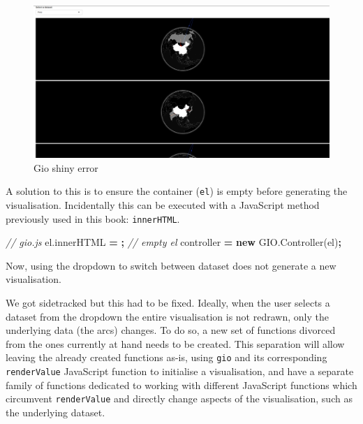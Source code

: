 \documentclass[
]{krantz}
\makeatletter
\newenvironment{Shaded}{\begin{snugshade}}{\end{snugshade}}
\newcommand{\AttributeTok}[1]{\textcolor[rgb]{0.61,0.61,0.61}{#1}}
\newcommand{\CommentTok}[1]{\textcolor[rgb]{0.37,0.37,0.37}{\textit{#1}}}
\newcommand{\KeywordTok}[1]{\textcolor[rgb]{0.27,0.27,0.27}{\textbf{#1}}}
\newcommand{\NormalTok}[1]{#1}
\newcommand{\OperatorTok}[1]{\textcolor[rgb]{0.43,0.43,0.43}{\textbf{#1}}}
\newcommand{\StringTok}[1]{\textcolor[rgb]{0.5,0.5,0.5}{#1}}
\newcommand{\VariableTok}[1]{\textcolor[rgb]{0,0,0}{#1}}
\newenvironment{kframe}{%
\medskip{}
\setlength{\fboxsep}{.8em}
 \def\at@end@of@kframe{}%
 \ifinner\ifhmode%
  \def\at@end@of@kframe{\end{minipage}}%
  \begin{minipage}{\columnwidth}%
 \fi\fi%
 \def\FrameCommand##1{\hskip\@totalleftmargin \hskip-\fboxsep
 \colorbox{shadecolor}{##1}\hskip-\fboxsep
     \hskip-\linewidth \hskip-\@totalleftmargin \hskip\columnwidth}%
 \MakeFramed {\advance\hsize-\width
   \@totalleftmargin\z@ \linewidth\hsize
   \@setminipage}}%
 {\par\unskip\endMakeFramed%
 \at@end@of@kframe}
\renewenvironment{Shaded}{\begin{kframe}}{\end{kframe}}
\makeatother
\begin{document}
\begin{figure}
\centering
\includegraphics{images/gio-shiny-error.png}
\caption{Gio shiny error}
\end{figure}

A solution to this is to ensure the container (\texttt{el}) is empty before generating the visualisation. Incidentally this can be executed with a JavaScript method previously used in this book: \texttt{innerHTML}.

\begin{Shaded}
\begin{Highlighting}[]
\CommentTok{// gio.js}
\VariableTok{el}\NormalTok{.}\AttributeTok{innerHTML} \OperatorTok{=} \StringTok{\textquotesingle{}\textquotesingle{}}\OperatorTok{;} \CommentTok{// empty el}
\NormalTok{controller }\OperatorTok{=} \KeywordTok{new} \VariableTok{GIO}\NormalTok{.}\AttributeTok{Controller}\NormalTok{(el)}\OperatorTok{;}
\end{Highlighting}
\end{Shaded}

Now, using the dropdown to switch between dataset does not generate a new visualisation.

We got sidetracked but this had to be fixed. Ideally, when the user selects a dataset from the dropdown the entire visualisation is not redrawn, only the underlying data (the arcs) changes. To do so, a new set of functions divorced from the ones currently at hand needs to be created. This separation will allow leaving the already created functions as-is, using \texttt{gio} and its corresponding \texttt{renderValue} JavaScript function to initialise a visualisation, and have a separate family of functions dedicated to working with different JavaScript functions which circumvent \texttt{renderValue} and directly change aspects of the visualisation, such as the underlying dataset.
\end{document}
